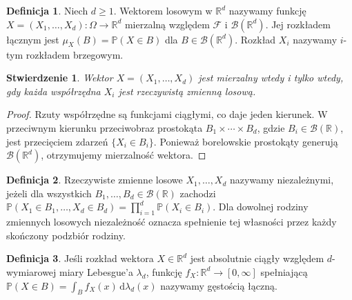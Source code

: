 \documentclass[11pt,a4paper,oneside]{report}
\numberwithin{equation}{chapter}
\theoremstyle{plain}
\newtheorem{stwierdzenie}[twierdzenie]{Stwierdzenie}
\theoremstyle{definition}
\newtheorem{definicja}{Definicja}[chapter]
\theoremstyle{remark}
\newcommand{\R}{\mathbb{R}}
\newcommand{\Prob}{\mathbb{P}}
\newcommand{\dd}{\mathrm{d}}
\begin{document}
\begin{definicja}
Niech $d\geq1$. Wektorem losowym w $\R^d$ nazywamy funkcję
$X=(X_1,\ldots,X_d):\Omega\to\R^d$ mierzalną względem
$\mathcal F$ i $\mathcal B(\R^d)$. Jej rozkładem łącznym jest
$\mu_X(B)=\Prob(X\in B)$ dla $B\in\mathcal B(\R^d)$.
Rozkład $X_i$ nazywamy $i$-tym rozkładem brzegowym.
\end{definicja}

\begin{stwierdzenie}
Wektor $X=(X_1,\ldots,X_d)$ jest mierzalny wtedy i tylko wtedy,
gdy każda współrzędna $X_i$ jest rzeczywistą zmienną losową.
\end{stwierdzenie}
\begin{proof}
Rzuty współrzędne są funkcjami ciągłymi, co daje jeden kierunek.
W przeciwnym kierunku przeciwobraz prostokąta
$B_1\times\cdots\times B_d$, gdzie $B_i\in\mathcal B(\R)$,
jest przecięciem zdarzeń $\{X_i\in B_i\}$. Ponieważ
borelowskie prostokąty generują $\mathcal B(\R^d)$,
otrzymujemy mierzalność wektora.
\end{proof}

\begin{definicja}
Rzeczywiste zmienne losowe $X_1,\ldots,X_d$ nazywamy niezależnymi,
jeżeli dla wszystkich $B_1,\ldots,B_d\in\mathcal B(\R)$ zachodzi
$\Prob(X_1\in B_1,\ldots,X_d\in B_d)=\prod_{i=1}^d\Prob(X_i\in B_i)$.
Dla dowolnej rodziny zmiennych losowych niezależność oznacza
spełnienie tej własności przez każdy skończony podzbiór rodziny.
\end{definicja}

\begin{definicja}
Jeśli rozkład wektora $X\in\R^d$ jest absolutnie ciągły względem
$d$-wymiarowej miary Lebesgue'a $\lambda_d$, funkcję
$f_X:\R^d\to[0,\infty]$ spełniającą
$\Prob(X\in B)=\int_B f_X(x)\,\dd\lambda_d(x)$ nazywamy
gęstością łączną.
\end{definicja}
\end{document}
